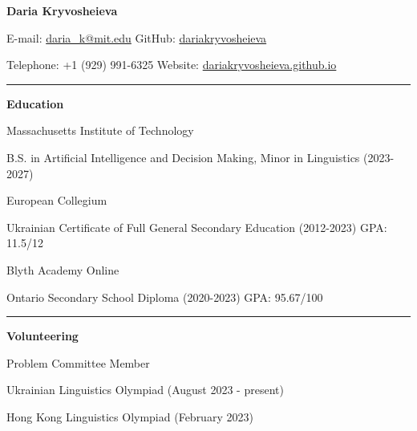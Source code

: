 \documentclass[12pt]{article}
\begin{document}
\begin{center} {\large\textbf{Daria Kryvosheieva}} \end{center}

\vspace{8pt}

\small{E-mail: \href{mailto:daria\_k@mit.edu}{daria\_k@mit.edu} \hfill GitHub: \href{https://github.com/dariakryvosheieva}{dariakryvosheieva}}

\small{Telephone: +1 (929) 991-6325 \hfill Website: \href{https://dariakryvosheieva.github.io}{dariakryvosheieva.github.io}}

\vspace{8pt}

\hrule

\vspace{16pt}

\large{\textbf{Education}}

\vspace{8pt}

\normalsize{Massachusetts Institute of Technology}

\quad \small{B.S. in Artificial Intelligence and Decision Making, Minor in Linguistics (2023-2027)}

\vspace{4pt}

\normalsize{European Collegium}

\quad \small{Ukrainian Certificate of Full General Secondary Education (2012-2023) GPA: 11.5/12}

\vspace{4pt}

\normalsize{Blyth Academy Online}

\quad \small{Ontario Secondary School Diploma (2020-2023) GPA: 95.67/100}

\vspace{8pt}

\hrule

\vspace{16pt}

\large{\textbf{Volunteering}}

\vspace{8pt}

\normalsize{Problem Committee Member}

\vspace{4pt}

\quad \small{Ukrainian Linguistics Olympiad (August 2023 - present)}

\quad \small{Hong Kong Linguistics Olympiad (February 2023)}
\end{document}
